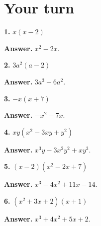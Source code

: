 \documentclass{ximera}
\begin{document}
\section*{Your turn}


\begin{problem}

\textbf{1.} $x(x-2)$

\begin{hint}
\textbf{Answer.} $x^{2} - 2 x$.
\end{hint}
\end{problem}

\begin{problem}

\textbf{2.} $3a^{2}(a-2)$

\begin{hint}
\textbf{Answer.} $3 a^{3} - 6 a^{2}$.
\end{hint}
\end{problem}

\begin{problem}

\textbf{3.} $-x(x+7)$

\begin{hint}
\textbf{Answer.} $- x^{2} - 7 x$.
\end{hint}
\end{problem}

\begin{problem}

\textbf{4.} $xy\left(x^{2}-3xy+y^{2}\right)$

\begin{hint}
\textbf{Answer.} $x^{3} y - 3 x^{2} y^{2} + x y^{3}$.
\end{hint}
\end{problem}

\begin{problem}

\textbf{5.} $(x-2)\left(x^{2}-2x+7\right)$

\begin{hint}
\textbf{Answer.} $x^{3} - 4 x^{2} + 11 x - 14$.
\end{hint}
\end{problem}

\begin{problem}

\textbf{6.} $\left(x^{2}+3x+2\right)(x+1)$

\begin{hint}
\textbf{Answer.} $x^{3} + 4 x^{2} + 5 x + 2$.
\end{hint}
\end{problem}
\end{document}
